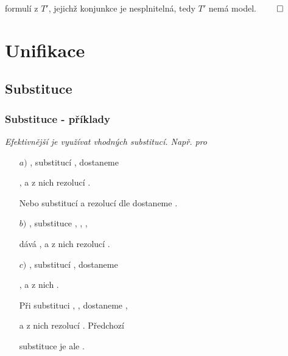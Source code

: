     formulí z $T'$, jejichž konjunkce je nesplnitelná, tedy $T'$ nemá model. $\qed$
    
    
    


\section{Unifikace}\todo

\subsection{Substituce}\todo

\subsubsection*{Substituce - příklady}
    
    {\it Efektivnější je využívat vhodných substitucí. Např. pro}
    \smallskip
    
    \begin{enumerate}
    \item[$a)$] ,  substitucí ,  dostaneme
    \smallskip
    
    ,  a z nich rezolucí .
    \medskip
    
    Nebo substitucí  a rezolucí dle  dostaneme .
    \medskip
    
    \item[$b)$] ,  substituce , , , 
    \smallskip
    
    dává ,  a z nich rezolucí .
    \medskip
    
    \item[$c)$] ,  substitucí ,  dostaneme
    \smallskip
    
    ,  a z nich .
    \medskip
    
    Při substituci , ,  dostaneme ,
    \smallskip
    
     a z nich rezolucí . Předchozí
    \smallskip
    
    substituce je ale .
    \end{enumerate}
    
